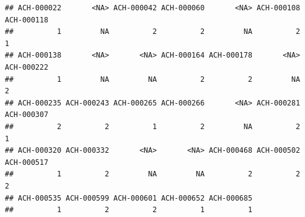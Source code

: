 \documentclass[
]{article}
\begin{document}
\begin{verbatim}
## ACH-000022       <NA> ACH-000042 ACH-000060       <NA> ACH-000108 ACH-000118 
##          1         NA          2          2         NA          2          1 
## ACH-000138       <NA>       <NA> ACH-000164 ACH-000178       <NA> ACH-000222 
##          1         NA         NA          2          2         NA          2 
## ACH-000235 ACH-000243 ACH-000265 ACH-000266       <NA> ACH-000281 ACH-000307 
##          2          2          1          2         NA          2          1 
## ACH-000320 ACH-000332       <NA>       <NA> ACH-000468 ACH-000502 ACH-000517 
##          1          2         NA         NA          2          2          2 
## ACH-000535 ACH-000599 ACH-000601 ACH-000652 ACH-000685 
##          1          2          2          1          1
\end{verbatim}
\end{document}
